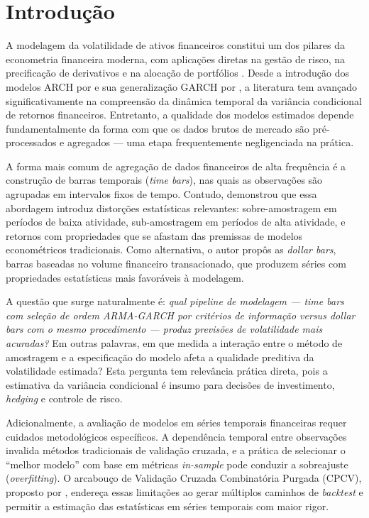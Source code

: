 \chapter{Introdução}
\label{cap:introducao}

A modelagem da volatilidade de ativos financeiros constitui um dos pilares
da econometria financeira moderna, com aplicações diretas na gestão de
risco, na precificação de derivativos e na alocação de
portfólios \cite{tsay2010}. Desde a introdução dos modelos ARCH por
 e sua generalização GARCH por
, a literatura tem avançado significativamente
na compreensão da dinâmica temporal da variância condicional de retornos
financeiros. Entretanto, a qualidade dos modelos estimados depende
fundamentalmente da forma com que os dados brutos de mercado são
pré-processados e agregados --- uma etapa frequentemente negligenciada na
prática.

A forma mais comum de agregação de dados financeiros de alta frequência é
a construção de barras temporais (\emph{time bars}), nas quais as
observações são agrupadas em intervalos fixos de tempo. Contudo,
 demonstrou que essa abordagem introduz
distorções estatísticas relevantes: sobre-amostragem em períodos de baixa
atividade, sub-amostragem em períodos de alta atividade, e retornos com
propriedades que se afastam das premissas de modelos econométricos
tradicionais. Como alternativa, o autor propôs as \emph{dollar bars},
barras baseadas no volume financeiro transacionado, que produzem séries com
propriedades estatísticas mais favoráveis à modelagem.

A questão que surge naturalmente é: \emph{qual pipeline de modelagem ---
\emph{time bars} com seleção de ordem ARMA-GARCH por critérios de
informação versus \emph{dollar bars} com o mesmo procedimento --- produz
previsões de volatilidade mais acuradas?} Em outras palavras, em que medida
a interação entre o método de amostragem e a especificação do modelo afeta
a qualidade preditiva da volatilidade estimada? Esta pergunta tem relevância
prática direta, pois a estimativa da variância condicional é insumo para
decisões de investimento, \emph{hedging} e controle de risco.

Adicionalmente, a avaliação de modelos em séries temporais financeiras
requer cuidados metodológicos específicos. A dependência temporal entre
observações invalida métodos tradicionais de validação cruzada, e a prática
de selecionar o ``melhor modelo'' com base em métricas \emph{in-sample}
pode conduzir a sobreajuste (\emph{overfitting}). O arcabouço de Validação
Cruzada Combinatória Purgada (CPCV), proposto por
, endereça essas limitações ao gerar
múltiplos caminhos de \emph{backtest} e permitir a estimação das
estatísticas em séries temporais com maior rigor.

